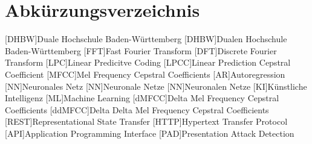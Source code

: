 \section*{Abkürzungsverzeichnis}
\begin{acronym}
  [DHBW]{Duale Hochschule Ba\-den-\-Würt\-tem\-berg}
  [DHBW]{Dualen Hochschule Ba\-den-\-Würt\-tem\-berg}
  [FFT]{Fast Fourier Transform}
  [DFT]{Discrete Fourier Transform}
  [LPC]{Linear Predicitve Coding}
  [LPCC]{Linear Prediction Cepstral Coefficient}
  [MFCC]{Mel Frequency Cepstral Coefficients}
  [AR]{Autoregression}
  [NN]{Neuronales Netz}
  [NN]{Neuronale Netze}
  [NN]{Neuronalen Netze}
  [KI]{Künstliche Intelligenz}
  [ML]{Machine Learning}
  [dMFCC]{Delta Mel Frequency Cepstral Coefficients}
  [ddMFCC]{Delta Delta Mel Frequency Cepstral Coefficients}
  [REST]{Representational State Transfer}
  [HTTP]{Hypertext Transfer Protocol}
  [API]{Application Programming Interface}
  [PAD]{Presentation Attack Detection}

\end{acronym}
\newpage